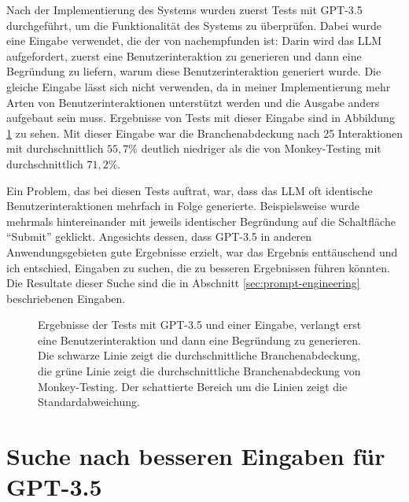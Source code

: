 Nach der Implementierung des Systems wurden zuerst Tests mit GPT-3.5 durchgeführt, um die Funktionalität des Systems zu überprüfen.
Dabei wurde eine Eingabe verwendet, die der von  nachempfunden ist:
Darin wird das LLM aufgefordert, zuerst eine Benutzerinteraktion zu generieren und dann eine Begründung zu liefern, warum diese Benutzerinteraktion generiert wurde.
Die gleiche Eingabe lässt sich nicht verwenden, da in meiner Implementierung mehr Arten von Benutzerinteraktionen unterstützt werden und die Ausgabe anders aufgebaut sein muss.
Ergebnisse von Tests mit dieser Eingabe sind in Abbildung \ref{fig:gpt3_5_explain_after} zu sehen.
Mit dieser Eingabe war die Branchenabdeckung nach 25 Interaktionen mit durchschnittlich $55{,}7\%$ deutlich niedriger als die von Monkey-Testing mit durchschnittlich $71{,}2\%$.

Ein Problem, das bei diesen Tests auftrat, war, dass das LLM oft identische Benutzerinteraktionen mehrfach in Folge generierte.
Beispielsweise wurde mehrmals hintereinander mit jeweils identischer Begründung auf die Schaltfläche \enquote{Submit} geklickt.
Angesichts dessen, dass GPT-3.5 in anderen Anwendungsgebieten gute Ergebnisse erzielt, war das Ergebnis enttäuschend und ich entschied, Eingaben zu suchen, die zu besseren Ergebnissen führen könnten.
Die Resultate dieser Suche sind die in Abschnitt \ref{sec:prompt-engineering} beschriebenen Eingaben.

\begin{figure}[h]
    \centering
    \caption{Ergebnisse der Tests mit GPT-3.5 und einer Eingabe, verlangt erst eine Benutzerinteraktion und dann eine Begründung zu generieren. Die schwarze Linie zeigt die durchschnittliche Branchenabdeckung, die grüne Linie zeigt die durchschnittliche Branchenabdeckung von Monkey-Testing. Der schattierte Bereich um die Linien zeigt die Standardabweichung.}
    \label{fig:gpt3_5_explain_after}
\end{figure}

\section{Suche nach besseren Eingaben für GPT-3.5}
\label{sec:prompt-engineering:2}


